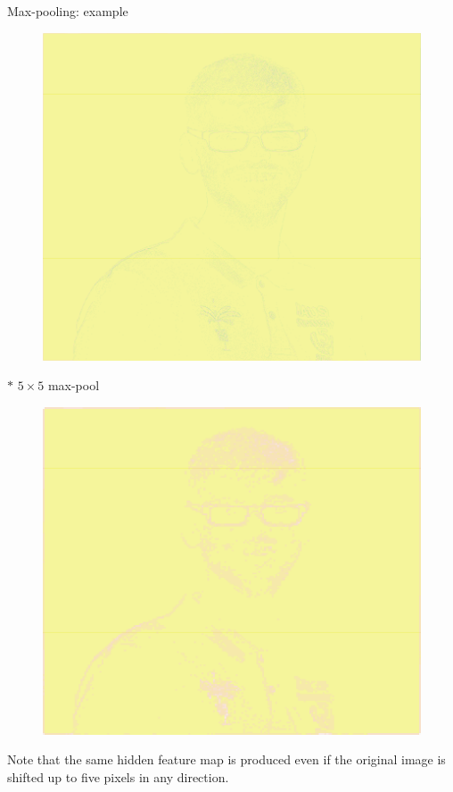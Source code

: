 \documentclass{beamer}
\begin{document}
\begin{frame}{Max-pooling: example}

\begin{minipage}{0.32\linewidth}
\begin{figure}
\includegraphics[width=\linewidth]{Images/conv16.png}
\end{figure}

\end{minipage}
\begin{minipage}{0.32\linewidth}
$ *$ $5 \times 5$ max-pool
\end{minipage}
\begin{minipage}{0.32\linewidth}
\begin{figure}
\includegraphics[width=\linewidth]{Images/conv18.png}
\end{figure}
\end{minipage}
\vfill
Note that the same hidden feature map is produced even if the original image is shifted up to five pixels in any direction.
\end{frame}
\end{document}
